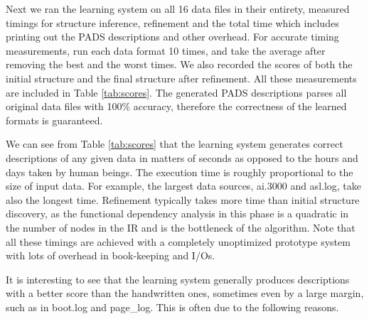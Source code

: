 Next we ran the learning system on all 16 data files in their entirety, 
measured timings for structure inference, refinement and the total time which includes
printing out the PADS descriptions and other overhead. 
For accurate timing measurements, run each data format 10 times, and take the average 
after removing the best and the worst times.
We also recorded the scores of both the initial structure and the final structure after refinement.
All these measurements are included in Table \ref{tab:scores}.
The generated PADS descriptions parses all original data files with 100\% accuracy,
therefore the correctness of the learned formats is guaranteed.

We can see from Table \ref{tab:scores} that the learning system
generates correct descriptions of any given data in matters of seconds as opposed to
the hours and days taken by human beings. The execution time is roughly proportional
to the size of input data. For example, the largest data sources, ai.3000 and asl.log,
take also the longest time. Refinement typically takes more time than initial
structure discovery, as the functional dependency analysis in this phase is a quadratic
in the number of nodes in the IR and is the bottleneck of the algorithm. 
Note that all these timings are achieved with a completely unoptimized prototype system
with lots of overhead in book-keeping and I/Os.

It is interesting to see that the learning system generally produces descriptions
with a better score than the handwritten ones, sometimes even by a large margin, such
as in boot.log and page\_log. This is often due to the following reasons.

